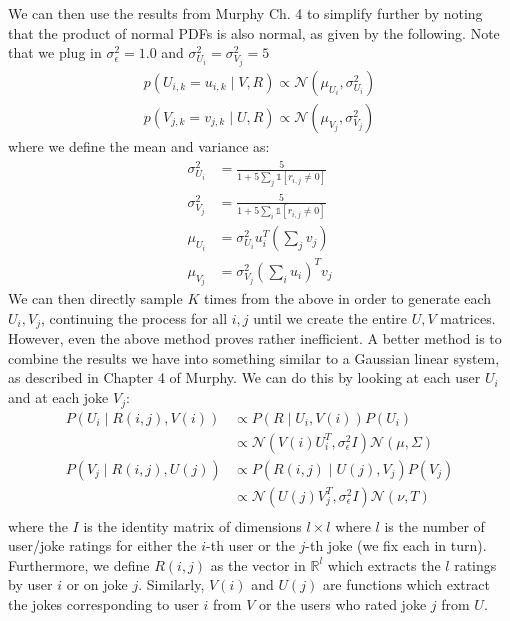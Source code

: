 \documentclass{harvardml}
\newcommand{\N}{\mathcal{N}}
\theoremstyle{plain}
\begin{document}
\begin{enumerate}
We can then use the results from Murphy Ch. 4 to simplify further by noting that the product of normal PDFs is also normal, as given by the following. Note that we plug in $\sigma_{\epsilon}^2 = 1.0$ and $\sigma_{U_i}^2 = \sigma_{V_j}^2 = 5$
\begin{align*}
p(U_{i,k} = u_{i,k} \mid V,R) \propto \N(\mu_{U_i}, \sigma_{U_i}^2) \\
p(V_{j,k} = v_{j,k} \mid U,R) \propto \N(\mu_{V_j}, \sigma_{V_j}^2)
\end{align*}
where we define the mean and variance as:
\begin{align*}
\sigma_{U_i}^2 &= \frac{5}{1 + 5 \sum_{j} \mathbb{1}[r_{i,j} \neq 0]}\\
\sigma_{V_j}^2 &=\frac{5}{1 + 5 \sum_{i} \mathbb{1}[r_{i,j} \neq 0]}\\
\mu_{U_i} &= \sigma_{U_i}^2 u_i^T \left (\sum_{j}v_j \right) \\
\mu_{V_j} &= \sigma_{V_j}^2 \left(\sum_i{u_i}\right)^T v_j
\end{align*}
We can then directly sample $K$ times from the above in order to generate each $U_i, V_j$, continuing the process for all $i,j$ until we create the entire $U,V$ matrices. \\

However, even the above method proves rather inefficient. A better method is to combine the results we have into something similar to a Gaussian linear system, as described in Chapter 4 of Murphy. We can do this by looking at each user $U_i$ and at each joke $V_j$:
\begin{align*}
P(U_i \mid R(i,j), V(i)) &\propto P(R \mid U_i, V(i))P(U_i) \\
&\propto \N(V(i)U_i^T, \sigma_{\epsilon}^2 I)\N(\mu,\Sigma) \\
P(V_j \mid R(i,j), U(j)) &\propto P(R(i,j) \mid U(j), V_j)P(V_j) \\
&\propto \N(U(j)V_j^T, \sigma_{\epsilon}^2 I)\N(\nu,T) \\\end{align*}
where the $I$ is the identity matrix of dimensions $l \times l$ where $l$ is the number of user/joke ratings for either the $i$-th user or the $j$-th joke (we fix each in turn). Furthermore, we define $R(i,j)$ as the vector in $\mathbb{R}^l$ which extracts the $l$ ratings by user $i$ or on joke $j$. Similarly, $V(i)$ and $U(j)$ are functions which extract the jokes corresponding to user $i$ from $V$ or the users who rated joke $j$ from $U$. \\


\end{enumerate}
\end{document}
